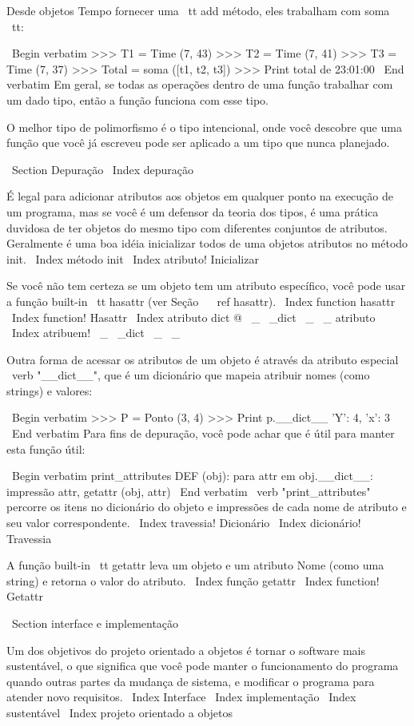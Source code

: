 \documentclass[10pt]{book}
\begin{document}
{{{{{{{{{{{{{{Desde objetos Tempo fornecer uma {\ tt add} método, eles trabalham
com {soma \ tt}:

\ Begin {verbatim}
>>> T1 = Time (7, 43)
>>> T2 = Time (7, 41)
>>> T3 = Time (7, 37)
>>> Total = soma ([t1, t2, t3])
>>> Print total de
23:01:00
\ End {verbatim}
%
Em geral, se todas as operações dentro de uma função 
trabalhar com um dado tipo, então a função funciona com esse tipo.

O melhor tipo de polimorfismo é o tipo intencional, onde
você descobre que uma função que você já escreveu pode ser
aplicado a um tipo que nunca planejado.


\ Section {} Depuração
\ Index {depuração}

É legal para adicionar atributos aos objetos em qualquer ponto na execução
de um programa, mas se você é um defensor da teoria dos tipos, é uma
prática duvidosa de ter objetos do mesmo tipo com diferentes
conjuntos de atributos. Geralmente é uma boa idéia
inicializar todos de uma objetos atributos no método init.
\ Index {método init}
\ Index {atributo! Inicializar}

Se você não tem certeza se um objeto tem um atributo específico, você
pode usar a função built-in {\ tt hasattr} (ver Seção ~ \ ref {hasattr}).
\ Index {function hasattr}
\ Index {function! Hasattr}
\ Index {atributo dict @ \ _ \ _dict \ _ \ _ atributo}
\ Index {atribuem! \ _ \ _dict \ _ \ _}

Outra forma de acessar os atributos de um objeto é através da
atributo especial \ verb "__dict__", que é um dicionário que mapeia
atribuir nomes (como strings) e valores:

\ Begin {verbatim}
>>> P = Ponto (3, 4)
>>> Print p.__dict__
{'Y': 4, 'x': 3}
\ End {verbatim}
%
Para fins de depuração, você pode achar que é útil para manter esta
função útil:

\ Begin {verbatim}
print_attributes DEF (obj):
    para attr em obj.__dict__:
        impressão attr, getattr (obj, attr)
\ End {verbatim}
%
\ verb "print_attributes" percorre os itens no dicionário do objeto
e impressões de cada nome de atributo e seu valor correspondente.
\ Index {travessia! Dicionário}
\ Index {dicionário! Travessia}

A função built-in {\ tt getattr} leva um objeto e um atributo
Nome (como uma string) e retorna o valor do atributo.
\ Index {função getattr}
\ Index {function! Getattr}


\ Section {interface e implementação}

Um dos objetivos do projeto orientado a objetos é tornar o software mais
sustentável, o que significa que você pode manter o funcionamento do programa quando
outras partes da mudança de sistema, e modificar o programa para atender novo
requisitos.
\ Index {Interface}
\ Index {implementação}
\ Index {} sustentável
\ Index {projeto orientado a objetos}

}}}}}}}}}}}}}}
\end{document}
